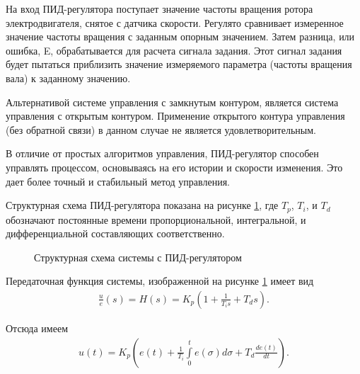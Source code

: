         На вход ПИД-регулятора поступает значение частоты
        вращения ротора электродвигателя, снятое с датчика скорости. Регулято
        сравнивает измеренное значение частоты вращения  с заданным опорным
        значением. Затем разница, или ошибка, E, обрабатывается для расчета
        сигнала задания. Этот сигнал задания будет пытаться приблизить значение
        измеряемого параметра (частоты вращения вала) к заданному значению.

        Альтернативой системе управления с замкнутым контуром, является система
        управления с открытым контуром. Применение открытого контура управления
        (без обратной связи) в данном случае не является удовлетворительным.

        В отличие от простых алгоритмов управления, ПИД-регулятор способен
        управлять процессом, основываясь на его истории и скорости изменения.
        Это дает более точный и стабильный метод управления.

        Структурная схема ПИД-регулятора показана на рисунке \ref{fig:pid}, где
        $T_p$, $T_i$, и $T_d$ обозначают постоянные времени пропорциональной,
        интегральной, и дифференциальной составляющих соответственно.

        \begin{figure}[h!]
            \caption{Структурная схема системы с ПИД-регулятором}
            \label{fig:pid}
        \end{figure}


        Передаточная функция системы, изображенной на рисунке \ref{fig:pid}
        имеет вид
        \begin{gather*}
            \frac{u}{e}(s) = H(s) = K_p \left(1 + \frac{1}{T_i s} + T_d s\right).
        \end{gather*}

        Отсюда имеем
        \begin{gather*}
            u(t) = K_p \left( e(t)+\frac{1}{T_i} 
                \int \limits_0^t e(\sigma)d \sigma + T_d \frac{de(t)}{dt} \right).
        \end{gather*}


